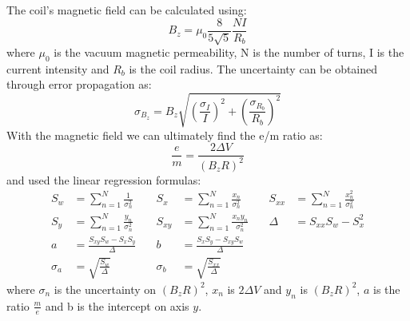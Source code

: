 The coil's magnetic field can be calculated using:
\begin{equation*}
    B_z=\mu_0\frac{8}{5\sqrt{5}}\frac{NI}{R_b}
\end{equation*}
where $\mu_0$ is the vacuum magnetic permeability, N is the number of turns, I is the current intensity and $R_b$ is the coil radius. The uncertainty can be obtained through error propagation as:
\begin{equation*}
    \sigma_{B_z}=B_z \sqrt{\left(\frac{\sigma_I}{I}\right)^2+\left(\frac{\sigma_{R_b}}{R_b}\right)^2}
\end{equation*}
With the magnetic field we can ultimately find the e/m ratio as:
\begin{equation*}
    \frac{e}{m}=\frac{2\Delta V}{(B_zR)^2}
\end{equation*}
and used the linear regression formulas:
\begin{align*}
S_w &= \sum_{n=1}^N \frac{1}{\sigma_n^2} & \quad S_x &= \sum_{n=1}^N \frac{x_n}{\sigma_n^2} & \quad S_{xx} &= \sum_{n=1}^N \frac{x_n^2}{\sigma_n^2} \\
S_y &= \sum_{n=1}^N \frac{y_n}{\sigma_n^2} & \quad S_{xy} &= \sum_{n=1}^N \frac{x_n y_n}{\sigma_n^2}  & \quad \Delta &= S_{xx} S_w - S_x^2 \\
a &= \frac{S_{xy} S_w - S_x S_y}{\Delta} & \quad b &= \frac{S_x S_y - S_{xy} S_w}{\Delta} \\
\sigma_a &= \sqrt{\frac{S_w}{\Delta}} & \quad \sigma_b &= \sqrt{\frac{S_{xx}}{\Delta}} 
\end{align*}
where  $\sigma_n$ is the uncertainty on $(B_zR)^2$, $x_n$ is $2 \Delta V$ and  $y_n$ is $(B_zR)^2$, $a$ is the ratio $\frac{m}{e}$ and b is the intercept on axis $y$.

